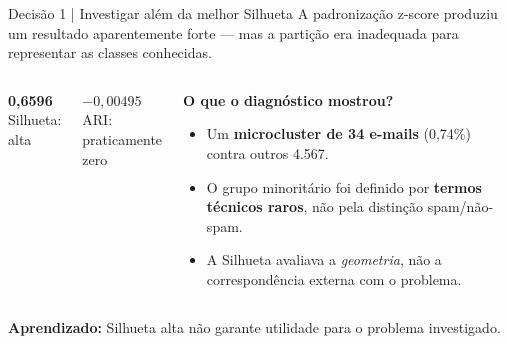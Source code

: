 \documentclass[aspectratio=169,11pt]{beamer}
\newcommand{\kpi}[3]{%
\begin{tcolorbox}[colback=#3!8,colframe=#3!32,boxrule=.55pt,arc=2mm,
  halign=center,left=1mm,right=1mm,top=1.8mm,bottom=1.8mm]
{\fontsize{23}{24}\selectfont\bfseries\color{#3}#1}\\[1mm]
{\footnotesize #2}
\end{tcolorbox}}
\begin{document}
\begin{frame}[t]{Decisão 1 | Investigar além da melhor Silhueta}
\small\color{cinzaescuro}A padronização z-score produziu um resultado aparentemente forte --- mas a partição era inadequada para representar as classes conhecidas.
\vspace{2mm}
\begin{columns}[T,onlytextwidth]
\kpi{0,6596}{Silhueta: alta}{laranja}
\kpi{$-0,00495$}{ARI: praticamente zero}{cinazul}
\begin{simplebox}
\textbf{O que o diagnóstico mostrou?}\par\vspace{1mm}
\small
\begin{itemize}\setlength\itemsep{2mm}
\item Um \textbf{microcluster de 34 e-mails} (0,74\%) contra outros 4.567.
\item O grupo minoritário foi definido por \textbf{termos técnicos raros}, não pela distinção spam/não-spam.
\item A Silhueta avaliava a \emph{geometria}, não a correspondência externa com o problema.
\end{itemize}
\end{simplebox}
\end{columns}
\vspace{1.5mm}
{\footnotesize\color{laranja}\textbf{Aprendizado:} Silhueta alta não garante utilidade para o problema investigado.}
\end{frame}
\end{document}

